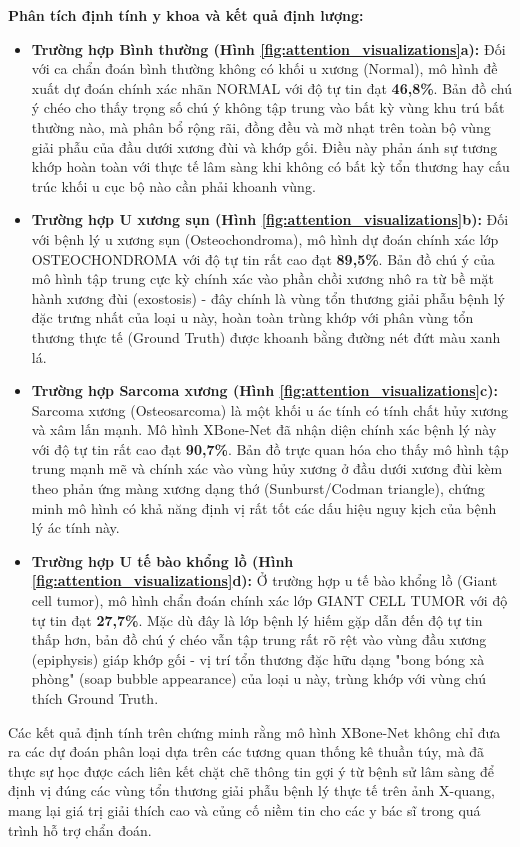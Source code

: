\textbf{Phân tích định tính y khoa và kết quả định lượng:}
\begin{itemize}
    \item \textbf{Trường hợp Bình thường (Hình \ref{fig:attention_visualizations}a):} Đối với ca chẩn đoán bình thường không có khối u xương (Normal), mô hình đề xuất dự đoán chính xác nhãn NORMAL với độ tự tin đạt \textbf{46,8\%}. Bản đồ chú ý chéo cho thấy trọng số chú ý không tập trung vào bất kỳ vùng khu trú bất thường nào, mà phân bổ rộng rãi, đồng đều và mờ nhạt trên toàn bộ vùng giải phẫu của đầu dưới xương đùi và khớp gối. Điều này phản ánh sự tương khớp hoàn toàn với thực tế lâm sàng khi không có bất kỳ tổn thương hay cấu trúc khối u cục bộ nào cần phải khoanh vùng.
    \item \textbf{Trường hợp U xương sụn (Hình \ref{fig:attention_visualizations}b):} Đối với bệnh lý u xương sụn (Osteochondroma), mô hình dự đoán chính xác lớp OSTEOCHONDROMA với độ tự tin rất cao đạt \textbf{89,5\%}. Bản đồ chú ý của mô hình tập trung cực kỳ chính xác vào phần chồi xương nhô ra từ bề mặt hành xương đùi (exostosis) - đây chính là vùng tổn thương giải phẫu bệnh lý đặc trưng nhất của loại u này, hoàn toàn trùng khớp với phân vùng tổn thương thực tế (Ground Truth) được khoanh bằng đường nét đứt màu xanh lá.
    \item \textbf{Trường hợp Sarcoma xương (Hình \ref{fig:attention_visualizations}c):} Sarcoma xương (Osteosarcoma) là một khối u ác tính có tính chất hủy xương và xâm lấn mạnh. Mô hình XBone-Net đã nhận diện chính xác bệnh lý này với độ tự tin rất cao đạt \textbf{90,7\%}. Bản đồ trực quan hóa cho thấy mô hình tập trung mạnh mẽ và chính xác vào vùng hủy xương ở đầu dưới xương đùi kèm theo phản ứng màng xương dạng thớ (Sunburst/Codman triangle), chứng minh mô hình có khả năng định vị rất tốt các dấu hiệu nguy kịch của bệnh lý ác tính này.
    \item \textbf{Trường hợp U tế bào khổng lồ (Hình \ref{fig:attention_visualizations}d):} Ở trường hợp u tế bào khổng lồ (Giant cell tumor), mô hình chẩn đoán chính xác lớp GIANT CELL TUMOR với độ tự tin đạt \textbf{27,7\%}. Mặc dù đây là lớp bệnh lý hiếm gặp dẫn đến độ tự tin thấp hơn, bản đồ chú ý chéo vẫn tập trung rất rõ rệt vào vùng đầu xương (epiphysis) giáp khớp gối - vị trí tổn thương đặc hữu dạng "bong bóng xà phòng" (soap bubble appearance) của loại u này, trùng khớp với vùng chú thích Ground Truth.
\end{itemize}

Các kết quả định tính trên chứng minh rằng mô hình XBone-Net không chỉ đưa ra các dự đoán phân loại dựa trên các tương quan thống kê thuần túy, mà đã thực sự học được cách liên kết chặt chẽ thông tin gợi ý từ bệnh sử lâm sàng để định vị đúng các vùng tổn thương giải phẫu bệnh lý thực tế trên ảnh X-quang, mang lại giá trị giải thích cao và củng cố niềm tin cho các y bác sĩ trong quá trình hỗ trợ chẩn đoán.
\fi
\fi

